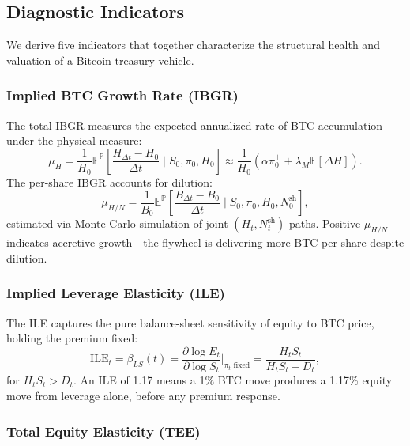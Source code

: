 \subsection{Diagnostic Indicators}

We derive five indicators that together characterize the structural health and valuation of a Bitcoin treasury vehicle.

\subsubsection{Implied BTC Growth Rate (IBGR)}

The total IBGR measures the expected annualized rate of BTC accumulation under the physical measure:
\begin{equation}
    \mu_H = \frac{1}{H_0} \mathbb{E}^{\mathbb{P}} \left[\frac{H_{\Delta t} - H_0}{\Delta t} \;\bigg|\; S_0, \pi_0, H_0 \right] \approx \frac{1}{H_0}\left(\alpha \pi_0^+ + \lambda_M \mathbb{E}[\Delta H]\right).
\end{equation}
The per-share IBGR accounts for dilution:
\begin{equation}
    \mu_{H/N} = \frac{1}{B_0} \mathbb{E}^{\mathbb{P}} \left[\frac{B_{\Delta t} - B_0}{\Delta t} \;\bigg|\; S_0, \pi_0, H_0, N_0^{\text{sh}} \right],
\end{equation}
estimated via Monte Carlo simulation of joint $(H_t, N_t^{\text{sh}})$ paths. Positive $\mu_{H/N}$ indicates accretive growth---the flywheel is delivering more BTC per share despite dilution.

\subsubsection{Implied Leverage Elasticity (ILE)}

The ILE captures the pure balance-sheet sensitivity of equity to BTC price, holding the premium fixed:
\begin{equation}
    \text{ILE}_t = \beta_{LS}(t) = \frac{\partial \log E_t}{\partial \log S_t}\bigg|_{\pi_t\text{ fixed}} = \frac{H_t S_t}{H_t S_t - D_t},
\end{equation}
for $H_t S_t > D_t$. An ILE of 1.17 means a 1\% BTC move produces a 1.17\% equity move from leverage alone, before any premium response.

\subsubsection{Total Equity Elasticity (TEE)}


